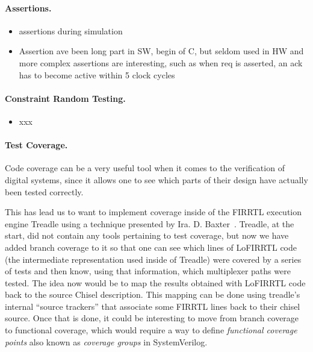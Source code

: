 \documentclass[fleqn,12pt]{article}
\begin{document}
\paragraph{Assertions.}

\begin{itemize}
\item assertions during simulation
\item Assertion ave been long part in SW, begin of C, but seldom used in HW and more complex assertions are interesting, such as when req is asserted, an ack has to become active within 5 clock cycles
\end{itemize}

\paragraph{Constraint Random Testing.}

\begin{itemize}
\item xxx
\end{itemize}


\paragraph{Test Coverage.}

Code coverage can be a very useful tool when it comes to the verification of digital systems, since it allows one to see which parts of their design have actually been tested correctly. 

This has lead us to want to implement coverage inside of the FIRRTL execution engine Treadle using a technique
presented by Ira. D. Baxter~\cite{branch-cov-made-easy:2002}. Treadle, at the start, did not contain any tools
pertaining to test coverage, but now we have added branch coverage to it so that one can see which lines of
LoFIRRTL code (the intermediate representation used inside of Treadle) were covered by a series of tests
and then know, using that information, which multiplexer paths were tested. 
The idea now would be to map the results obtained with LoFIRRTL code back to the source Chisel description.
This mapping can be done using treadle's internal ``source trackers'' that associate some FIRRTL lines back
to their chisel source. Once that is done, it could be interesting to move from branch coverage to functional
coverage, which would require a way to define \textit{functional coverage points} also known as
\textit{coverage groups} in SystemVerilog.
\end{document}
